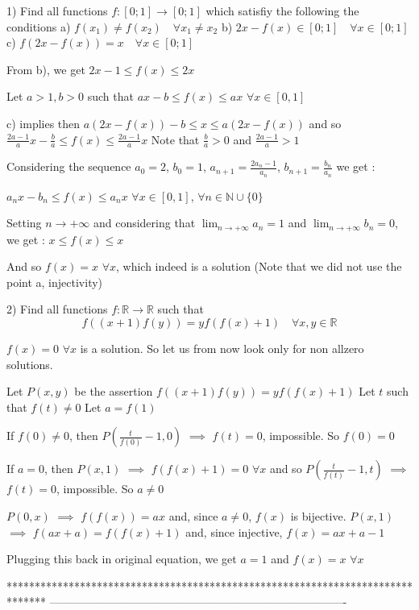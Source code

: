 \begin{solution}
	\begin{tcolorbox}1) Find all functions $f:[0;1]\to [0;1]$  which satisfiy the following the conditions 
a) $f(x_{1})\neq f(x_{2}) \quad \forall x_{1}\neq x_{2}$
b) $2x-f(x)\in [0;1] \quad \forall x\in [0;1]$
c) $f(2x-f(x))=x \quad \forall x\in [0;1]$\end{tcolorbox}
From b), we get $2x-1\le f(x)\le 2x$

Let $a>1,b>0$ such that $ax-b\le f(x)\le ax$ $\forall x\in[0,1]$

c) implies then $a(2x-f(x))-b\le x\le a(2x-f(x))$ and so $\frac{2a-1}ax-\frac ba\le f(x) \le \frac{2a-1}ax$
Note that $\frac ba>0$ and $\frac {2a-1}a>1$

Considering the sequence $a_0=2$, $b_0=1$, $a_{n+1}=\frac{2a_n-1}{a_n}$, $b_{n+1}=\frac{b_n}{a_n}$ we get :

$a_nx-b_n\le f(x)\le a_nx$ $\forall x\in[0,1]$, $\forall n\in\mathbb N\cup\{0\}$

Setting $n\to+\infty$ and considering that $\lim_{n\to+\infty}a_n=1$ and $\lim_{n\to+\infty}b_n=0$, we get :
$x\le f(x)\le x$

And so $\boxed{f(x)=x}$ $\forall x$, which indeed is a solution
(Note that we did not use the point a, injectivity)
\end{solution}



\begin{solution}
	\begin{tcolorbox}2) Find all functions $f:\mathbb{R}\to\mathbb{R}$ such that
\[f((x+1)f(y))=yf(f(x)+1) \quad \forall x,y \in \mathbb{R}\]\end{tcolorbox}
$\boxed{f(x)=0}$ $\forall x$ is a solution. So let us from now look only for non allzero solutions.

Let $P(x,y)$ be the assertion $f((x+1)f(y))=yf(f(x)+1)$
Let $t$ such that $f(t)\ne 0$
Let $a=f(1)$

If $f(0)\ne 0$, then $P(\frac t{f(0)}-1,0)$ $\implies$ $f(t)=0$, impossible. So $f(0)=0$

If $a=0$, then $P(x,1)$ $\implies$ $f(f(x)+1)=0$ $\forall x$ and so $P(\frac t{f(t)}-1,t)$ $\implies$ $f(t)=0$, impossible. So $a\ne 0$

$P(0,x)$ $\implies$ $f(f(x))=ax$ and, since $a\ne 0$, $f(x)$ is bijective.
$P(x,1)$ $\implies$ $f(ax+a)=f(f(x)+1)$ and, since injective, $f(x)=ax+a-1$

Plugging this back in original equation, we get $a=1$ and $\boxed{f(x)=x}$ $\forall x$
\end{solution}
*******************************************************************************
-------------------------------------------------------------------------------

